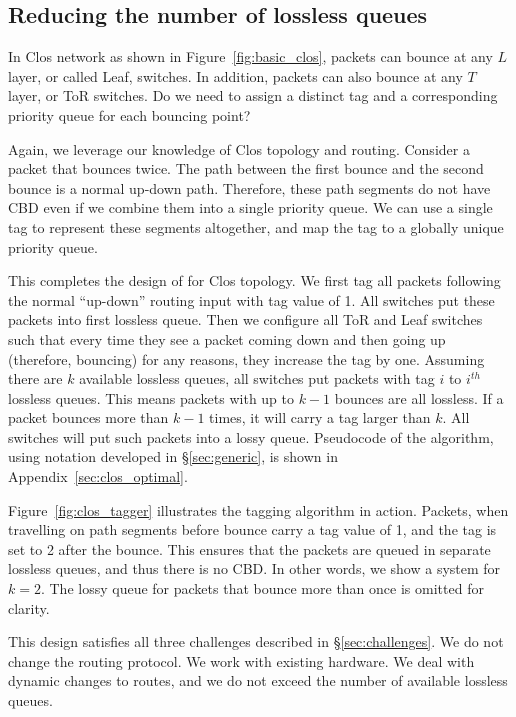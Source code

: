 \subsection{Reducing the number of lossless queues}
\label{subsec:combine}

In Clos network as shown in Figure~\ref{fig:basic_clos}, packets can
bounce at any $L$ layer, or called Leaf, switches. In addition, packets can also
bounce at any $T$ layer, or ToR switches. Do we need to assign a distinct tag
and a corresponding priority queue for each bouncing point?

Again, we leverage our knowledge of Clos topology and routing. Consider a packet
that bounces twice. The path between the first bounce and the second bounce is a
normal up-down path. Therefore, these path segments do not have CBD even if we
combine them into a single priority queue. We can use a single tag to represent
these segments altogether, and map the tag to a globally unique priority queue.

This completes the design of \sysname{} for Clos topology.  We first tag all
packets following the normal ``up-down'' routing input with tag value of 1. All
switches put these packets into first lossless queue. Then we configure all ToR
and Leaf switches such that every time they see a packet coming down and then
going up (therefore, bouncing) for any reasons, they increase the tag by one.
Assuming there are $k$ available lossless queues, all switches put packets with
tag $i$ to $i^{th}$ lossless queues. This means packets with up to $k-1$ bounces
are all lossless. If a packet bounces more than $k-1$ times, it will carry a tag
larger than $k$. All switches will put such packets into a lossy queue.
Pseudocode of the algorithm, using notation developed in \S\ref{sec:generic}, is
shown in Appendix~\ref{sec:clos_optimal}.

Figure~\ref{fig:clos_tagger} illustrates the tagging algorithm in
action.  Packets, when travelling on path segments before bounce carry a tag
value of 1, and the tag is set to 2 after the bounce. This ensures that the
packets are queued in separate lossless queues, and thus there is no CBD. In
other words, we show a system for $k=2$. The lossy queue for packets that bounce
more than once is omitted for clarity.

This design satisfies all three challenges described in
\S\ref{sec:challenges}. We do not change the routing protocol. We work with
existing hardware. We deal with dynamic changes to routes, and we do not exceed
the number of available lossless queues.

